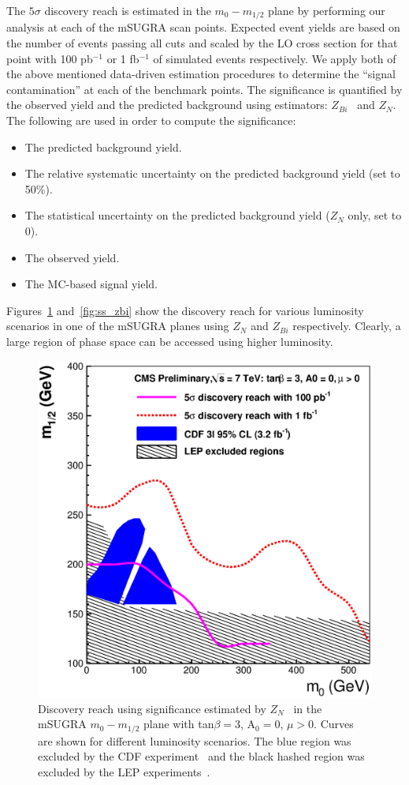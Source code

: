 The $5\sigma$  discovery reach is estimated in the $m_{0}-m_{1/2}$
plane by  performing our analysis at each of the  mSUGRA scan points.
Expected event yields are based on the number of events passing
all cuts and scaled by the LO cross section for that point with 100 pb$^{-1}$ or 1 fb$^{-1}$ 
of simulated events respectively. We apply both of the above mentioned data-driven 
estimation procedures to determine the ``signal contamination'' at each of the benchmark points. 
The significance is quantified by the observed yield and the predicted background
using estimators: $Z_{Bi}$~\cite{cite:cousins}  and $Z_{N}$\cite{cite:conway}. The following
are used in order to compute the significance:
\begin{itemize}
\item The predicted background yield.
\item The relative systematic  uncertainty on the predicted background
yield (set to 50\%).
\item The  statistical uncertainty  on the predicted  background yield
($Z_N$ only, set to 0).
\item The observed yield.
\item The MC-based signal yield.

\end{itemize}
Figures~\ref{fig:ss_zn} and~\ref{fig:ss_zbi} show the discovery reach for various 
luminosity scenarios in one of the mSUGRA planes using $Z_{N}$ and $Z_{Bi}$ respectively.
Clearly, a large region of phase space can be accessed using higher luminosity. 
\vspace{3 mm}
\begin{figure}[htb]
\begin{center}
\includegraphics[width=0.7\linewidth]{figs/massreachss_zn.eps}
\caption{Discovery reach using significance estimated by $Z_N$~\cite{cite:conway} 
in the mSUGRA $m_{0}-m_{1/2}$ plane with tan$\beta = 3$, A$_0 = 0$, $\mu > 0$. 
Curves are shown for different luminosity scenarios. The blue region was excluded by 
the CDF experiment~\cite{cdf:recentSusy} and the black hashed region was excluded by the LEP 
experiments~\cite{lep:lepsusyreach}.\label{fig:ss_zn}}
\end{center}
\end{figure}
